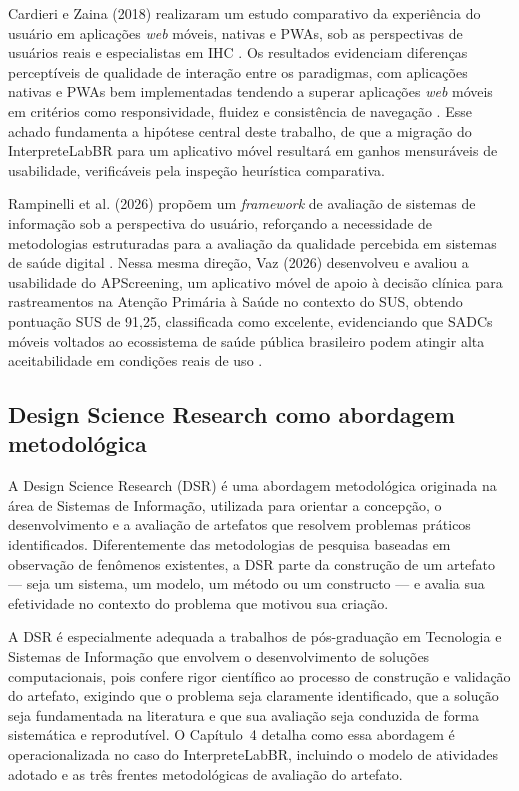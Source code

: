 \documentclass[12pt]{article}
\begin{document}
Cardieri e Zaina (2018) realizaram um estudo comparativo da experiência do usuário em aplicações \emph{web} móveis, nativas e PWAs, sob as perspectivas de usuários reais e especialistas em IHC \cite{cardieri2018}. Os resultados evidenciam diferenças perceptíveis de qualidade de interação entre os paradigmas, com aplicações nativas e PWAs bem implementadas tendendo a superar aplicações \emph{web} móveis em critérios como responsividade, fluidez e consistência de navegação \cite{cardieri2018}. Esse achado fundamenta a hipótese central deste trabalho, de que a migração do InterpreteLabBR para um aplicativo móvel resultará em ganhos mensuráveis de usabilidade, verificáveis pela inspeção heurística comparativa.

Rampinelli et al. (2026) propõem um \emph{framework} de avaliação de sistemas de informação sob a perspectiva do usuário, reforçando a necessidade de metodologias estruturadas para a avaliação da qualidade percebida em sistemas de saúde digital \cite{rampinelli2026}. Nessa mesma direção, Vaz (2026) desenvolveu e avaliou a usabilidade do APScreening, um aplicativo móvel de apoio à decisão clínica para rastreamentos na Atenção Primária à Saúde no contexto do SUS, obtendo pontuação SUS de 91,25, classificada como excelente, evidenciando que SADCs móveis voltados ao ecossistema de saúde pública brasileiro podem atingir alta aceitabilidade em condições reais de uso \cite{vaz2026}.

\subsection{Design Science Research como abordagem metodológica}

A Design Science Research (DSR) é uma abordagem metodológica originada na área de Sistemas de Informação, utilizada para orientar a concepção, o desenvolvimento e a avaliação de artefatos que resolvem problemas práticos identificados. Diferentemente das metodologias de pesquisa baseadas em observação de fenômenos existentes, a DSR parte da construção de um artefato --- seja um sistema, um modelo, um método ou um constructo --- e avalia sua efetividade no contexto do problema que motivou sua criação.

A DSR é especialmente adequada a trabalhos de pós-graduação em Tecnologia e Sistemas de Informação que envolvem o desenvolvimento de soluções computacionais, pois confere rigor científico ao processo de construção e validação do artefato, exigindo que o problema seja claramente identificado, que a solução seja fundamentada na literatura e que sua avaliação seja conduzida de forma sistemática e reprodutível. O Capítulo~4 detalha como essa abordagem é operacionalizada no caso do InterpreteLabBR, incluindo o modelo de atividades adotado e as três frentes metodológicas de avaliação do artefato.
\end{document}
